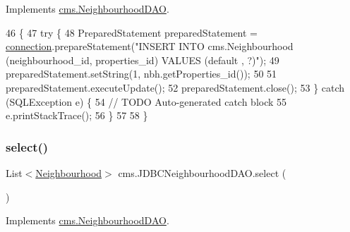 Implements \mbox{\hyperlink{interfacecms_1_1_neighbourhood_d_a_o_a6c9c689191c76d5be69f892f58a35494}{cms.\+Neighbourhood\+D\+AO}}.


\begin{DoxyCode}
46                                           \{
47         \textcolor{keywordflow}{try} \{
48             PreparedStatement preparedStatement = \mbox{\hyperlink{classcms_1_1_j_d_b_c_neighbourhood_d_a_o_a21abebcd3f93f10746a2c96c70d6dafc}{connection}}.prepareStatement(\textcolor{stringliteral}{"INSERT INTO
       cms.Neighbourhood (neighbourhood\_id, properties\_id) VALUES (default , ?)"});
49             preparedStatement.setString(1,  nbh.getProperties\_id());
50 
51             preparedStatement.executeUpdate();
52             preparedStatement.close();
53         \} \textcolor{keywordflow}{catch} (SQLException e) \{
54             \textcolor{comment}{// TODO Auto-generated catch block}
55             e.printStackTrace();
56         \}
57          
58     \}
\end{DoxyCode}
\mbox{\label{classcms_1_1_j_d_b_c_neighbourhood_d_a_o_a31a2e927837aa79108ef13890dd9be75}} 
\subsubsection{\texorpdfstring{select()}{select()}}
{\footnotesize\ttfamily List$<$\mbox{\hyperlink{classcms_1_1_neighbourhood}{Neighbourhood}}$>$ cms.\+J\+D\+B\+C\+Neighbourhood\+D\+A\+O.\+select (\begin{DoxyParamCaption}{ }\end{DoxyParamCaption})\hspace{0.3cm}{\ttfamily [inline]}}



Implements \mbox{\hyperlink{interfacecms_1_1_neighbourhood_d_a_o_af9fd7094c23742d68b86f0a83f544f9d}{cms.\+Neighbourhood\+D\+AO}}.



